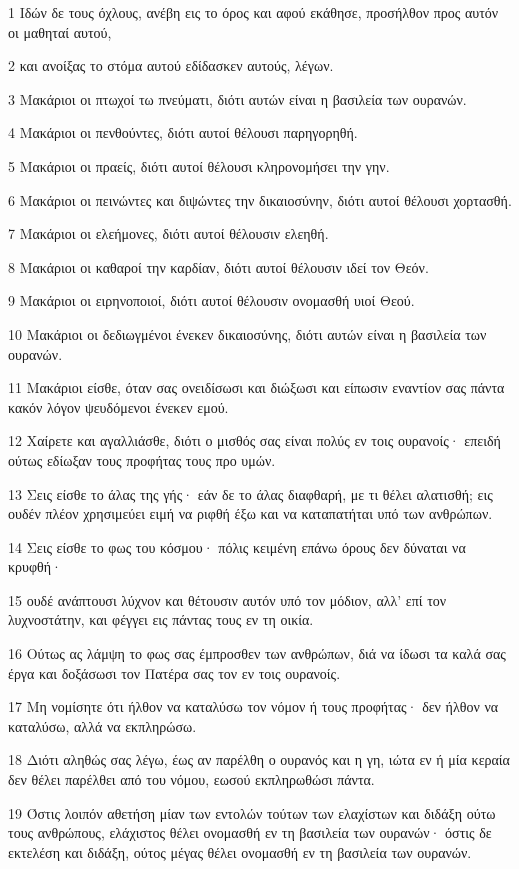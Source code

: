 \par 1 Ιδών δε τους όχλους, ανέβη εις το όρος και αφού εκάθησε, προσήλθον προς αυτόν οι μαθηταί αυτού,
\par 2 και ανοίξας το στόμα αυτού εδίδασκεν αυτούς, λέγων.
\par 3 Μακάριοι οι πτωχοί τω πνεύματι, διότι αυτών είναι η βασιλεία των ουρανών.
\par 4 Μακάριοι οι πενθούντες, διότι αυτοί θέλουσι παρηγορηθή.
\par 5 Μακάριοι οι πραείς, διότι αυτοί θέλουσι κληρονομήσει την γην.
\par 6 Μακάριοι οι πεινώντες και διψώντες την δικαιοσύνην, διότι αυτοί θέλουσι χορτασθή.
\par 7 Μακάριοι οι ελεήμονες, διότι αυτοί θέλουσιν ελεηθή.
\par 8 Μακάριοι οι καθαροί την καρδίαν, διότι αυτοί θέλουσιν ιδεί τον Θεόν.
\par 9 Μακάριοι οι ειρηνοποιοί, διότι αυτοί θέλουσιν ονομασθή υιοί Θεού.
\par 10 Μακάριοι οι δεδιωγμένοι ένεκεν δικαιοσύνης, διότι αυτών είναι η βασιλεία των ουρανών.
\par 11 Μακάριοι είσθε, όταν σας ονειδίσωσι και διώξωσι και είπωσιν εναντίον σας πάντα κακόν λόγον ψευδόμενοι ένεκεν εμού.
\par 12 Χαίρετε και αγαλλιάσθε, διότι ο μισθός σας είναι πολύς εν τοις ουρανοίς· επειδή ούτως εδίωξαν τους προφήτας τους προ υμών.
\par 13 Σεις είσθε το άλας της γής· εάν δε το άλας διαφθαρή, με τι θέλει αλατισθή; εις ουδέν πλέον χρησιμεύει ειμή να ριφθή έξω και να καταπατήται υπό των ανθρώπων.
\par 14 Σεις είσθε το φως του κόσμου· πόλις κειμένη επάνω όρους δεν δύναται να κρυφθή·
\par 15 ουδέ ανάπτουσι λύχνον και θέτουσιν αυτόν υπό τον μόδιον, αλλ' επί τον λυχνοστάτην, και φέγγει εις πάντας τους εν τη οικία.
\par 16 Ούτως ας λάμψη το φως σας έμπροσθεν των ανθρώπων, διά να ίδωσι τα καλά σας έργα και δοξάσωσι τον Πατέρα σας τον εν τοις ουρανοίς.
\par 17 Μη νομίσητε ότι ήλθον να καταλύσω τον νόμον ή τους προφήτας· δεν ήλθον να καταλύσω, αλλά να εκπληρώσω.
\par 18 Διότι αληθώς σας λέγω, έως αν παρέλθη ο ουρανός και η γη, ιώτα εν ή μία κεραία δεν θέλει παρέλθει από του νόμου, εωσού εκπληρωθώσι πάντα.
\par 19 Όστις λοιπόν αθετήση μίαν των εντολών τούτων των ελαχίστων και διδάξη ούτω τους ανθρώπους, ελάχιστος θέλει ονομασθή εν τη βασιλεία των ουρανών· όστις δε εκτελέση και διδάξη, ούτος μέγας θέλει ονομασθή εν τη βασιλεία των ουρανών.
